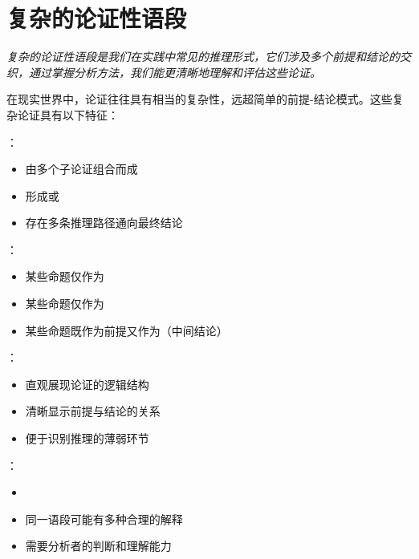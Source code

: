 \section{复杂的论证性语段}

\begin{logicbox}[title=引言]
\textit{复杂的论证性语段是我们在实践中常见的推理形式，它们涉及多个前提和结论的交织，通过掌握分析方法，我们能更清晰地理解和评估这些论证。}
\end{logicbox}

在现实世界中，论证往往具有相当的复杂性，远超简单的前提-结论模式。这些复杂论证具有以下特征：

\begin{theorembox}[title=复杂论证的结构特征]
：
\begin{itemize}
  \item 由多个子论证组合而成
  \item 形成或
  \item 存在多条推理路径通向最终结论
\end{itemize}

：
\begin{itemize}
  \item 某些命题仅作为
  \item 某些命题仅作为
  \item 某些命题既作为前提又作为（中间结论）
\end{itemize}
\end{theorembox}

\begin{theorembox}[title=图示法的作用与限制]
：
\begin{itemize}
  \item 直观展现论证的逻辑结构
  \item 清晰显示前提与结论的关系
  \item 便于识别推理的薄弱环节
\end{itemize}

：
\begin{itemize}
  \item {}
  \item 同一语段可能有多种合理的解释
  \item 需要分析者的判断和理解能力
\end{itemize}
\end{theorembox}

